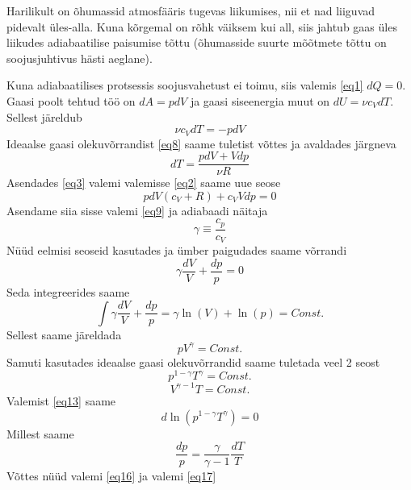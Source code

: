 \documentclass{trkut}%
\begin{document}
Harilikult on õhumassid atmosfääris tugevas liikumises, nii et nad liiguvad pidevalt üles-alla. Kuna kõrgemal on rõhk väiksem kui all, siis jahtub gaas üles liikudes adiabaatilise paisumise tõttu (õhumasside suurte mõõtmete tõttu on soojusjuhtivus hästi aeglane).

Kuna adiabaatilises protsessis soojusvahetust ei toimu, siis valemis \ref{eq1} $dQ=0$. Gaasi poolt tehtud töö on $d A=pdV$ ja gaasi siseenergia muut on $dU=\nu c_VdT$. Sellest järeldub
\begin{equation}\label{eq2}
\nu c_VdT = -pdV
\end{equation}
Ideaalse gaasi olekuvõrrandist \ref{eq8} saame tuletist võttes ja avaldades järgneva
\begin{equation}\label{eq3}
dT = \frac{pdV+Vdp}{\nu R}
\end{equation}
Asendades \ref{eq3} valemi valemisse \ref{eq2} saame uue seose
\begin{equation}\label{eq4}
pdV(c_V+R)+c_VVdp=0
\end{equation}
Asendame siia sisse valemi \ref{eq9} ja adiabaadi näitaja
\begin{equation*}
\gamma \equiv \frac{c_p}{c_V}
\end{equation*}
Nüüd eelmisi seoseid kasutades ja ümber paigudades saame võrrandi
\begin{equation*}
\gamma \frac{dV}{V} + \frac{dp}{p} = 0
\end{equation*}
Seda integreerides saame
\begin{equation*}
 \int \gamma \frac{dV}{V} + \frac{dp}{p} = \gamma \ln(V) + \ln(p) = Const.
\end{equation*}
Sellest saame järeldada
\begin{equation*}
pV^\gamma = Const.
\end{equation*}
Samuti kasutades ideaalse gaasi olekuvõrrandid saame tuletada veel 2 seost
\begin{equation}\label{eq13}
p^{1-\gamma}T^\gamma = Const.
\end{equation}
\begin{equation*}
V^{\gamma-1}T = Const.
\end{equation*}
Valemist \ref{eq13} saame
\begin{equation*}
d\ln(p^{1-\gamma}T^\gamma) = 0
\end{equation*}
Millest saame
\begin{equation}\label{eq17}
\frac{dp}{p} = \frac{\gamma}{\gamma-1}\frac{dT}{T}
\end{equation}
Võttes nüüd valemi \ref{eq16} ja valemi \ref{eq17}
\end{document}
